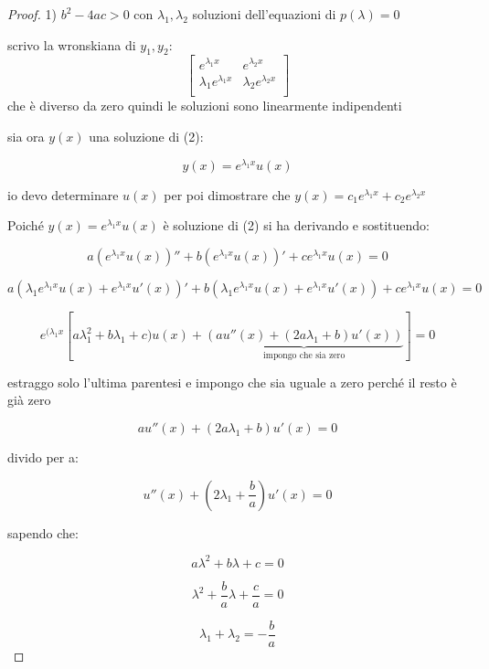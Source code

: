 \documentclass[11pt]{article}
\begin{document}
\begin{proof}
       1) $b^{2}-4ac >0$ con $\lambda_1,\lambda_2$ soluzioni dell'equazioni di $p(\lambda)=0$    

       scrivo la wronskiana di $y_1,y_2$:
       \[
        \begin{bmatrix}
            
        e ^{\lambda_1 x} & e ^{\lambda_2 x} \\
        \lambda_1e ^{\lambda_1 x} & \lambda_2e ^{\lambda_2 x} \\
        
        \end{bmatrix}
       \]
        che è diverso da zero quindi le soluzioni sono linearmente indipendenti

        sia ora $y(x)$ una soluzione di (2):

        \[
            y(x) = e ^{\lambda_1 x}u(x)
        \]

        io devo determinare $u(x)$ per poi dimostrare che $y(x) = c_1e ^{\lambda_1 x}+c_2 e^{\lambda_2 x}$

        Poiché $y(x) = e ^{\lambda_1 x}u(x)$ è soluzione di (2) si ha derivando e sostituendo:

        \[
            a( e ^{\lambda_1 x} u(x))'' + b(e ^{\lambda_1 x}u(x))'+ c e ^{\lambda_1 x}u(x) =0
        \]

        \[
            a(\lambda_1 e ^{\lambda_1 x} u(x)+ e ^{\lambda_1 x}u'(x))' + b(\lambda_1e ^{\lambda_1 x}u(x) + e ^{\lambda_1 x}u'(x))+ c e ^{\lambda_1 x}u(x) =0
        \]

        \[
            e ^{(\lambda_1 x}[a \lambda_1 ^{2} + b \lambda_1+c)u(x)+\underbrace{(au''(x)+(2a \lambda_1 + b)u'(x))}_\text{impongo che sia zero}]=0
        \]

        estraggo solo l'ultima parentesi e impongo che sia uguale a zero perché il resto è già zero

        \[
            au''(x) + (2a \lambda_1 + b) u'(x) = 0
        \]

        divido per a:

        \[
            u''(x) +(2 \lambda_1 + \frac{b}{a}) u'(x) = 0
        \]

        sapendo che:

        \[
            a \lambda^{2} + b \lambda + c =0
        \]

        \[
             \lambda^{2} + \frac{b}{a} \lambda + \frac{c}{a} =0
        \]

        \[
            \lambda_1 + \lambda_2 = -\frac{b}{a}
        \]


\end{proof}
\end{document}
